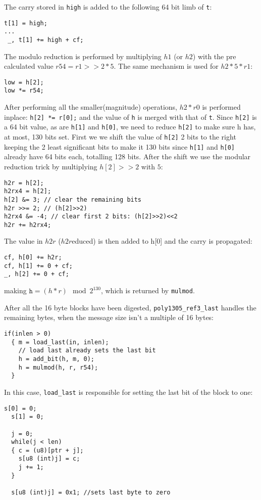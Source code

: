 \documentclass{article}
\begin{document}
The carry stored in \texttt{high} is added to the following 64 bit limb of \texttt{t}:
\begin{Verbatim}[fontsize=\footnotesize]
t[1] = high;
...
 _, t[1] += high + cf;
\end{Verbatim}
The modulo reduction is performed by multiplying $h1$ (or $h2$) with the pre calculated value $r54=r1>>2*5$. The same mechanism is used for $h2*5*r1$:
\begin{Verbatim}[fontsize=\footnotesize]
low = h[2];
low *= r54;
\end{Verbatim}

After performing all the smaller(magnitude) operations, $h2*r0$ is performed inplace: \texttt{h[2] *= r[0];} and the value of \texttt{h} is merged with that
of \texttt{t}.
Since \texttt{h[2]} is a 64 bit value, as are \texttt{h[1]} and \texttt{h[0]}, we need to reduce \texttt{h[2]} to make sure h has, at most, 130 bits set. 
First we we shift the value of \texttt{h[2]} 2 bits to the right keeping the 2 least significant bits to make it 130 bits since \texttt{h[1]} and \texttt{h[0]}
already have 64 bits each, totalling 128 bits. After the shift we use the modular reduction trick by multiplying $h[2]>>2$ with $5$:
\begin{Verbatim}[fontsize=\footnotesize]
h2r = h[2];
h2rx4 = h[2];
h[2] &= 3; // clear the remaining bits
h2r >>= 2; // (h[2]>>2)
h2rx4 &= -4; // clear first 2 bits: (h[2]>>2)<<2
h2r += h2rx4;
\end{Verbatim}

The value in $h2r$ ($h2r$educed) is then added to h[0] and the carry is propagated:

\begin{Verbatim}[fontsize=\footnotesize]
cf, h[0] += h2r;
cf, h[1] += 0 + cf;
_, h[2] += 0 + cf;
\end{Verbatim}

making $\texttt{h} = (h*r)\mod{2^{130}}$, which is returned by \texttt{mulmod}.

After all the 16 byte blocks have been digested, \texttt{poly1305\_ref3\_last} handles the remaining bytes, when the message size isn't a multiple of 16 bytes:
\begin{Verbatim}[fontsize=\footnotesize]
if(inlen > 0)
  { m = load_last(in, inlen);
    // load last already sets the last bit
    h = add_bit(h, m, 0);
    h = mulmod(h, r, r54);
  }
\end{Verbatim}
In this case, \texttt{load\_last} is responsible for setting the last bit of the block to one:
\begin{Verbatim}[fontsize=\footnotesize]
  s[0] = 0;
  s[1] = 0;

  j = 0;
  while(j < len)
  { c = (u8)[ptr + j];
    s[u8 (int)j] = c;
    j += 1;
  }

  s[u8 (int)j] = 0x1; //sets last byte to zero
\end{Verbatim}
\end{document}
